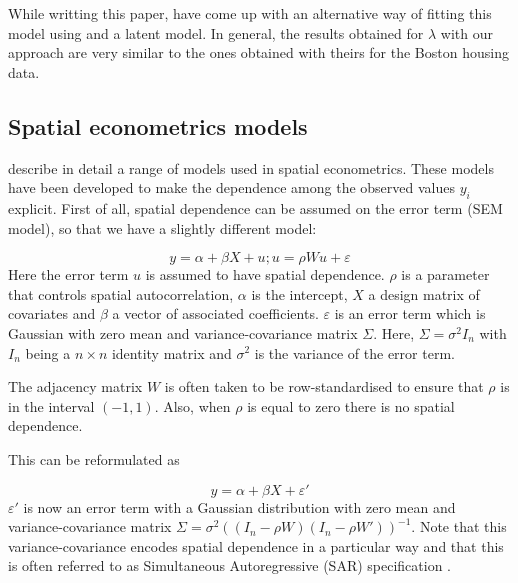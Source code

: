 \documentclass[article]{jss}
\begin{document}
While writting this paper, \citet{LeeMitchell:2013} have come up with an
alternative way of fitting this model using  and a 
latent model. In general, the results obtained for $\lambda$ with our approach
are very similar to the ones obtained with theirs for the Boston housing data.








\subsection{Spatial econometrics models}

\citet{LeSagePace:2009} describe in detail a range of models used in spatial
econometrics. These models have been developed to make the
dependence among the observed values $y_i$ explicit. First of all, spatial dependence
can be assumed on the error term (SEM model), so that we have a slightly different model:

\begin{equation}
y= \alpha+\beta X +u; u=\rho W u+\varepsilon
\end{equation}
\noindent
Here the error term $u$ is assumed to have spatial dependence.  $\rho$ is a
parameter that controls spatial autocorrelation, $\alpha$ is the intercept, $X$
a design matrix of covariates and $\beta$ a vector of associated coefficients.
$\varepsilon$ is an error term which is Gaussian with zero mean and
variance-covariance matrix $\Sigma$. Here, $\Sigma = \sigma^2 I_n$ with $I_n$
being a $n\times n$ identity matrix and $\sigma^2$ is the variance of the error
term.


The adjacency matrix $W$ is often taken to be row-standardised \citep[see, for
example,][]{Haining:2003} to ensure that $\rho$ is in the interval $(-1, 1)$.
Also, when $\rho$ is equal to zero there is no spatial dependence.

This can be reformulated as

\begin{equation}
y= \alpha+\beta X+\varepsilon'
\end{equation}
\noindent
$\varepsilon '$ is now an error term with a Gaussian distribution with zero
mean and variance-covariance matrix $\Sigma=\sigma^2((I_n-\rho W)(I_n-\rho W'))^{-1}$.
Note that this variance-covariance encodes spatial dependence in a particular
way and that this is often referred to as Simultaneous Autoregressive (SAR)
specification \citep[see, for example,][]{cressie:1993}.%
\end{document}

